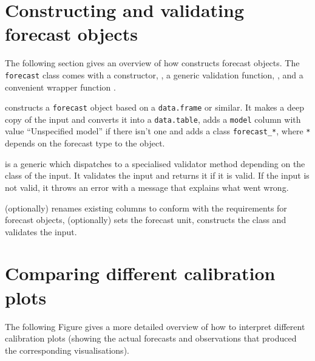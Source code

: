 \documentclass[
]{jss}
\begin{document}
\clearpage

\appendix
\renewcommand\thefigure{\thesection.\arabic{figure}}

\section{Constructing and validating forecast objects}

The following section gives an overview of how 
constructs forecast objects. The \texttt{forecast} class comes with a
constructor, , a generic validation function,
, and a convenient wrapper function
.

 constructs a \texttt{forecast} object based on a
\texttt{data.frame} or similar. It makes a deep copy of the input and
converts it into a \texttt{data.table}, adds a \texttt{model} column
with value ``Unspecified model'' if there isn't one and adds a class
\texttt{forecast\_*}, where \texttt{*} depends on the forecast type to
the object.

 is a generic which dispatches to a specialised
validator method depending on the class of the input. It validates the
input and returns it if it is valid. If the input is not valid, it
throws an error with a message that explains what went wrong.

 (optionally) renames existing columns to
conform with the requirements for forecast objects, (optionally) sets
the forecast unit, constructs the class and validates the input.

\clearpage

\section{Comparing different calibration plots}

The following Figure gives a more detailed overview of how to interpret
different calibration plots (showing the actual forecasts and
observations that produced the corresponding visualisations).
\end{document}
